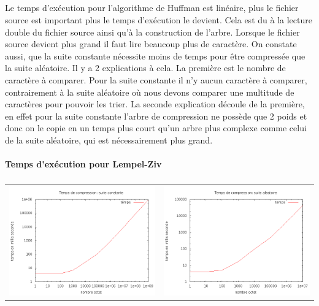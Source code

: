 \documentclass{report}
\begin{document}
\subparagraph*{}
Le temps d'exécution pour l'algorithme de Huffman est linéaire, plus le fichier source est important plus le temps d'exécution le devient. Cela est du à la lecture double du fichier source ainsi qu'à la construction de l'arbre. Lorsque le fichier source devient plus grand il faut lire beaucoup plus de caractère.    
On constate aussi, que la suite constante nécessite moins de temps pour être compressée que la suite aléatoire. Il y a 2 explications à cela. La première est le nombre de caractère à comparer. Pour la suite constante il n'y aucun caractère à comparer, contrairement à la suite aléatoire où nous devons comparer une multitude de caractères pour pouvoir les trier. La seconde explication découle de la première, en effet pour la suite constante l'arbre de compression ne possède que 2 poids et donc on le copie en un temps plus court qu'un arbre plus complexe comme celui de la suite aléatoire, qui est nécessairement plus grand.  

\paragraph*{}
\textbf{Temps d’exécution pour Lempel-Ziv}
\subparagraph*{}
\hspace{-2cm}\begin{tabular}{l | l}
\includegraphics[width=7cm]{tempsClzC.png} & 
\includegraphics[width=7cm]{tempsClzA.png}
\end{tabular}
\end{document}

